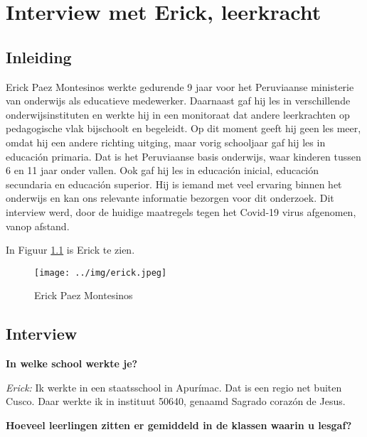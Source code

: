 \chapter{Interview met Erick, leerkracht}
\label{ch:interviewErick}

\section{Inleiding}
Erick Paez Montesinos werkte gedurende 9 jaar voor het Peruviaanse ministerie van onderwijs als educatieve medewerker. Daarnaast gaf hij les in verschillende onderwijsinstituten en werkte hij in een monitoraat dat andere leerkrachten op pedagogische vlak bijschoolt en begeleidt. Op dit moment geeft hij geen les meer, omdat hij een andere richting uitging, maar vorig schooljaar gaf hij les in educación primaria. Dat is het Peruviaanse basis onderwijs, waar kinderen tussen 6 en 11 jaar onder vallen. \autocite{Nuffic2015} Ook gaf hij les in educación inicial, educación secundaria en educación superior. Hij is iemand met veel ervaring binnen het onderwijs en kan ons relevante informatie bezorgen voor dit onderzoek. Dit interview werd, door de huidige maatregels tegen het Covid-19 virus afgenomen, vanop afstand.

 In Figuur \ref{erick} is Erick te zien.
 
 \begin{figure}[h!]
 	\texttt{[image: ../img/erick.jpeg]}
 	\caption{Erick Paez Montesinos }
 	\label{erick}
 \end{figure}

\section{Interview}

\textbf{In welke school werkte je?}

\textit{Erick:} Ik werkte in een staatsschool in Apurímac. Dat is een regio net buiten Cusco. Daar werkte ik in instituut 50640, genaamd Sagrado corazón de Jesus.

\textbf{Hoeveel leerlingen zitten er gemiddeld in de klassen waarin u lesgaf?}

